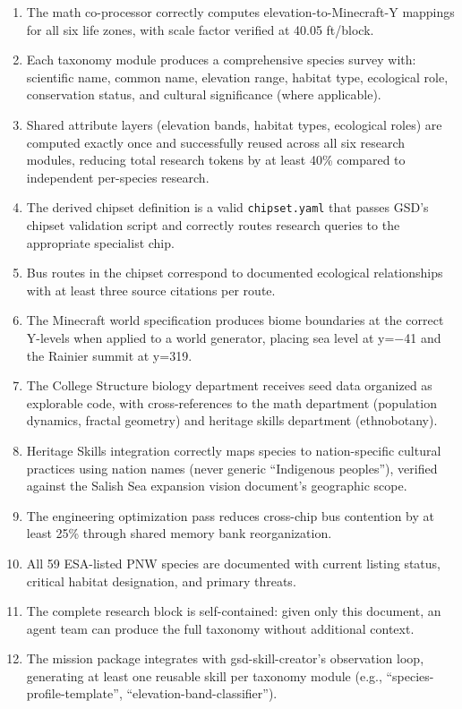 \documentclass[11pt,letterpaper]{article}
\begin{document}
\begin{enumerate}[leftmargin=2em]
\item The math co-processor correctly computes elevation-to-Minecraft-Y mappings for all six life zones, with scale factor verified at 40.05 ft/block.

\item Each taxonomy module produces a comprehensive species survey with: scientific name, common name, elevation range, habitat type, ecological role, conservation status, and cultural significance (where applicable).

\item Shared attribute layers (elevation bands, habitat types, ecological roles) are computed exactly once and successfully reused across all six research modules, reducing total research tokens by at least 40\% compared to independent per-species research.

\item The derived chipset definition is a valid \texttt{chipset.yaml} that passes GSD's chipset validation script and correctly routes research queries to the appropriate specialist chip.

\item Bus routes in the chipset correspond to documented ecological relationships with at least three source citations per route.

\item The Minecraft world specification produces biome boundaries at the correct Y-levels when applied to a world generator, placing sea level at y=$-$41 and the Rainier summit at y=319.

\item The College Structure biology department receives seed data organized as explorable code, with cross-references to the math department (population dynamics, fractal geometry) and heritage skills department (ethnobotany).

\item Heritage Skills integration correctly maps species to nation-specific cultural practices using nation names (never generic ``Indigenous peoples''), verified against the Salish Sea expansion vision document's geographic scope.

\item The engineering optimization pass reduces cross-chip bus contention by at least 25\% through shared memory bank reorganization.

\item All 59 ESA-listed PNW species are documented with current listing status, critical habitat designation, and primary threats.

\item The complete research block is self-contained: given only this document, an agent team can produce the full taxonomy without additional context.

\item The mission package integrates with gsd-skill-creator's observation loop, generating at least one reusable skill per taxonomy module (e.g., ``species-profile-template'', ``elevation-band-classifier'').
\end{enumerate}
\end{document}
